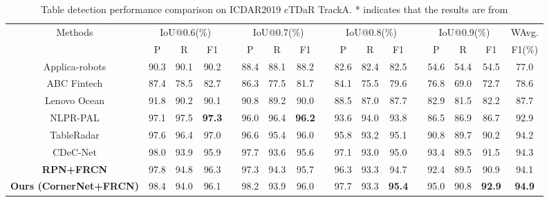 \documentclass[final,3p,times,twocolumn]{elsarticle}
\begin{document}
\begin{table*}[t]
    \setlength{\tabcolsep}{2.9pt}
    \footnotesize
    \centering
    \caption{Table detection performance comparison on ICDAR2019 cTDaR TrackA. * indicates that the results are from \cite{gao2019icdar}}
    \label{tab:cTDaR_TrackA}
    \begin{tabular}{ c  c  c  c  c  c  c  c  c  c  c  c  c  c  c  c  c}
        \toprule
        \multirow{2}{*}{Methods} & \multicolumn{3}{c}{IoU@0.6(\%)} && \multicolumn{3}{c}{IoU@0.7(\%)} &&
        \multicolumn{3}{c}{IoU@0.8(\%)} &&
        \multicolumn{3}{c}{IoU@0.9(\%)} & WAvg. \\\cline{2-4}\cline{6-8}\cline{10-12}\cline{14-16}
         & P & R & F1 && P & R & F1 && P & R & F1 && P & R & F1 & F1(\%)\\
        \midrule
        Applica-robots & 90.3 & 90.1 & 90.2 && 88.4 & 88.1 & 88.2 && 82.6 & 82.4 & 82.5 && 54.6 & 54.4 & 54.5 & 77.0  \\
        ABC Fintech & 87.4 & 78.5 & 82.7 && 86.3 & 77.5 & 81.7 && 84.1 & 75.5 & 79.6 && 76.8 & 69.0 & 72.7 & 78.6 \\
        Lenovo Ocean & 91.8 & 90.2 & 90.1 && 90.8 & 89.2 & 90.0 && 88.5 & 87.0 & 87.7 && 82.9 & 81.5 & 82.2 & 87.7  \\
        NLPR-PAL & 97.1 & 97.5 & \textbf{97.3} && 96.0 & 96.4 & \textbf{96.2} && 93.6 & 94.0 & 93.8 && 86.5 & 86.9 & 86.7 & 92.9  \\
        TableRadar & 97.6 & 96.4 & 97.0 && 96.6 & 95.4 & 96.0 && 95.8 & 93.2 & 95.1 && 90.8 & 89.7 & 90.2 & 94.2 \\
        CDeC-Net\cite{agarwal2021cdec} & 98.0 & 93.9 & 95.9 && 97.7 & 93.6 & 95.6 && 97.1 & 93.0 & 95.0 && 93.4 & 89.5 & 91.5 & 94.3 \\
        \midrule
        \textbf{RPN+FRCN} & 97.8 & 94.8 & 96.3 && 97.3 & 94.3 & 95.7 && 96.3 & 93.3 & 94.7 && 92.4 & 89.5 & 90.9 & 94.1 \\
        \textbf{Ours (CornerNet+FRCN)} & 98.4 & 94.0 & 96.1 && 98.2 & 93.9 & 96.0 && 97.7 & 93.3 & \textbf{95.4} && 95.0 & 90.8 & \textbf{92.9} & \textbf{94.9} \\
        \bottomrule
    \end{tabular}
\end{table*}
\end{document}
